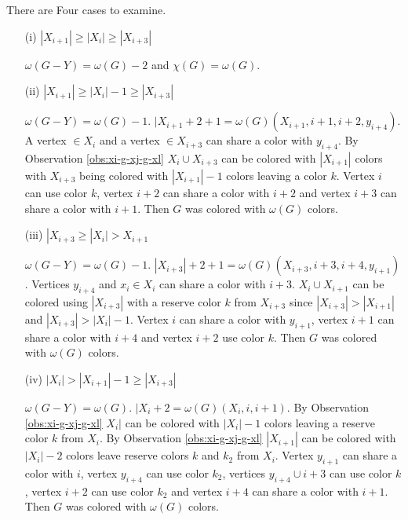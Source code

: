 \documentclass[12pt]{article}
\begin{document}
\begin{minipage}{0.5\textwidth}%
	 There are Four cases to examine.
	\begin{itemize}
	\item[(i)]
		$|X_{i+1}| \geq |X_i| \geq |X_{i+3}|$

		$\omega(G - Y) = \omega(G) - 2$ and $\chi(G) = \omega(G)$.

	\item[(ii)]
		$|X_{i+1}| \geq |X_i| - 1 \geq |X_{i+3}|$

		$\omega(G - Y) = \omega(G) - 1$. $|X_{i+1} + 2 + 1 = \omega(G) (X_{i+1}, i+1, i+2, y_{i+4})$. A vertex $\in X_i$ and a vertex $\in X_{i+3}$ can share a color with $y_{i+4}$. By Observation \ref{obs:xi-g-xj-g-xl} $X_i \cup X_{i+3}$ can be colored with $|X_{i+1}|$ colors with $X_{i+3}$ being colored with $|X_{i+1}| -1 $ colors leaving a color $k$. Vertex $i$ can use color $k$, vertex $i+2$ can share a color with $i+2$ and vertex $i+3$ can share a color with $i+1$. Then $G$ was colored with $\omega(G)$ colors.

	\item[(iii)]
		$|X_{i+3} \geq |X_{i}| > X_{i+1}$

		$\omega(G - Y) = \omega(G) - 1$. $|X_{i+3}| + 2 +1 = \omega(G) (X_{i+3}, i+3, i+4, y_{i+1})$. Vertices $y_{i+4}$ and $x_i \in X_i$ can share a color with $i+3$. $X_{i} \cup X_{i+1}$ can be colored using $|X_{i+3}|$ with a reserve color $k$ from $X_{i+3}$ since $|X_{i+3}| > |X_{i+1}|$ and $|X_{i+3}| > |X_i| - 1$. Vertex $i$ can share a color with $y_{i+1}$, vertex $i+1$ can share a color with $i+4$ and vertex $i+2$ use color $k$. Then $G$ was colored with $\omega(G)$ colors.

	\item[(iv)]
		$|X_{i}| > |X_{i+1}| - 1 \geq |X_{i+3}|$

		$\omega(G - Y) = \omega(G)$. $|X_{i} +2 = \omega(G) (X_{i}, i, i+1)$. By Observation \ref{obs:xi-g-xj-g-xl} $X_i|$ can be colored with $|X_i| - 1$ colors leaving a reserve color $k$ from $X_{i}$. By Observation \ref{obs:xi-g-xj-g-xl} $|X_{i+1}|$ can be colored with $|X_i| -2 $ colors leave reserve colors $k$ and $k_2$ from $X_{i}$. Vertex $y_{i+1}$ can share a color with $i$, vertex $y_{i+4}$ can use color $k_2$, vertices $y_{i+4} \cup i+3$ can use color $k$, vertex $i+2$ can use color $k_2$ and vertex $i+4$ can share a color with $i+1$. Then $G$ was colored with $\omega(G)$ colors.
	\end{itemize}
\end{minipage}
\end{document}
